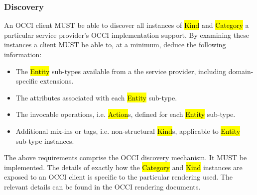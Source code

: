 \documentclass[10pt,a4paper,british]{article}
\begin{document}
\subsubsection{Discovery}
\label{sec:discovery}
An OCCI client MUST be able to discover all instances of \hl{Kind} and
\hl{Category} a particular service provider's OCCI implementation support. By
examining these instances a client MUST be able to, at a minimum, deduce the
following information:
\begin{itemize}
\item The \hl{Entity} sub-types available from a the service provider, including domain-specific extensions.
\item The attributes associated with each \hl{Entity} sub-type.
\item The invocable operations, i.e. \hl{Action}s, defined for each \hl{Entity} sub-type.
\item Additional mix-ins or tags, i.e. non-structural \hl{Kind}s, applicable to
 \hl{Entity} sub-type instances.
\end{itemize}
The above requirements comprise the OCCI discovery mechanism. It MUST be
implemented.
%
The details of exactly how the \hl{Category} and \hl{Kind} instances are
exposed to an OCCI client is specific to the particular rendering used.
The relevant details can be found in the OCCI rendering documents.

\end{document}
